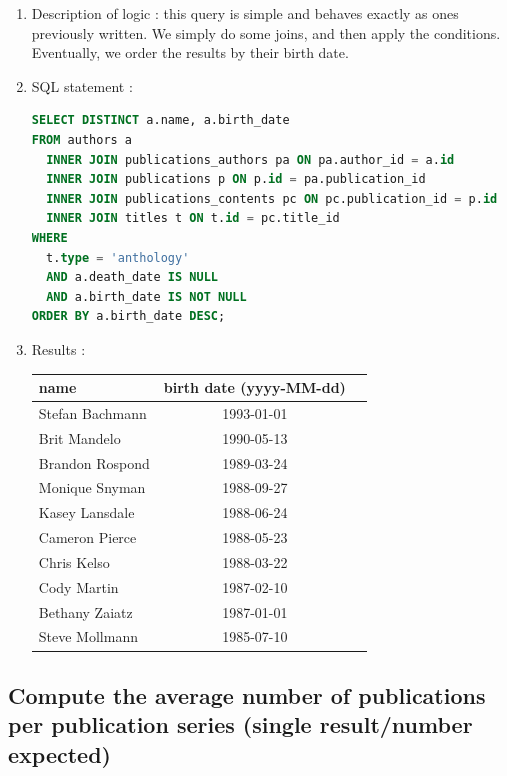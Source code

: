 \documentclass[doubleside, titlepage]{article}
\begin{document}
	\begin{enumerate}
	\item Description of logic : this query is simple and behaves exactly as ones previously written. We simply do some joins, and then apply the conditions. Eventually, we order the results by their birth date.
	\item SQL statement :
		\begin{lstlisting}[language=SQL,showspaces=false,basicstyle=\ttfamily,numberstyle=\tiny,commentstyle=\color{gray}]
SELECT DISTINCT a.name, a.birth_date
FROM authors a
  INNER JOIN publications_authors pa ON pa.author_id = a.id
  INNER JOIN publications p ON p.id = pa.publication_id
  INNER JOIN publications_contents pc ON pc.publication_id = p.id
  INNER JOIN titles t ON t.id = pc.title_id
WHERE
  t.type = 'anthology'
  AND a.death_date IS NULL
  AND a.birth_date IS NOT NULL
ORDER BY a.birth_date DESC;
		\end{lstlisting}

	\item Results :\\

	\begin{tabular}{|l|c|r|}
	  \hline
		name & birth date (yyyy-MM-dd)\\
	  \hline
Stefan Bachmann	& 1993-01-01\\
Brit Mandelo	& 1990-05-13\\
Brandon Rospond	& 1989-03-24\\
Monique Snyman	& 1988-09-27\\
Kasey Lansdale	& 1988-06-24\\
Cameron Pierce	& 1988-05-23\\
Chris Kelso	& 1988-03-22\\
Cody Martin	& 1987-02-10\\
Bethany Zaiatz	& 1987-01-01\\
Steve Mollmann	& 1985-07-10\\
	  \hline
	\end{tabular}
\end{enumerate}

\subsection{Compute the average number of publications per publication series (single result/number expected)}
\end{document}
